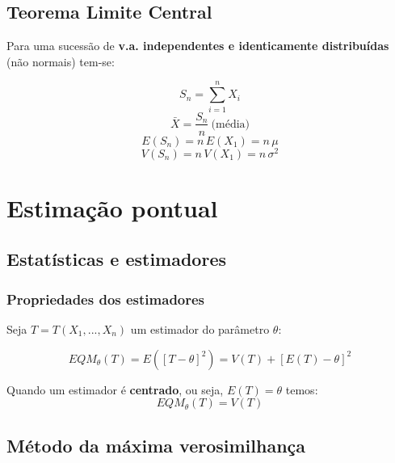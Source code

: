 \documentclass[11pt, a4paper]{article}
\begin{document}
\subsection{Teorema Limite Central}

Para uma sucessão de \textbf{v.a. independentes e identicamente distribuídas} (não normais) tem-se:

\begin{equation*}
    S_n = \sum_{i=1}^{n} X_i
\end{equation*}
\begin{equation*}
    \bar{X} = \frac{S_n}{n} \ \text{(média)}
\end{equation*}
\begin{equation*}
    E(S_n) = n \, E(X_1) = n \, \mu
\end{equation*}
\begin{equation*}
    V(S_n) = n \, V(X_1) = n \, \sigma^2
\end{equation*}

\vspace{20pt}
\section{Estimação pontual}


\subsection{Estatísticas e estimadores}


\subsubsection*{Propriedades dos estimadores}

Seja $T = T(X_1, ..., X_n)$ um estimador do parâmetro $\theta$:

\begin{equation*}
    EQM_\theta (T) = E\left([T - \theta]^2\right)
    = V(T) + \left[E(T) - \theta\right]^2
\end{equation*}

Quando um estimador é \textbf{centrado}, ou seja, $E(T) = \theta$ temos:
\begin{equation*}
    EQM_\theta (T) = V(T)
\end{equation*}


\subsection{Método da máxima verosimilhança}
\end{document}

